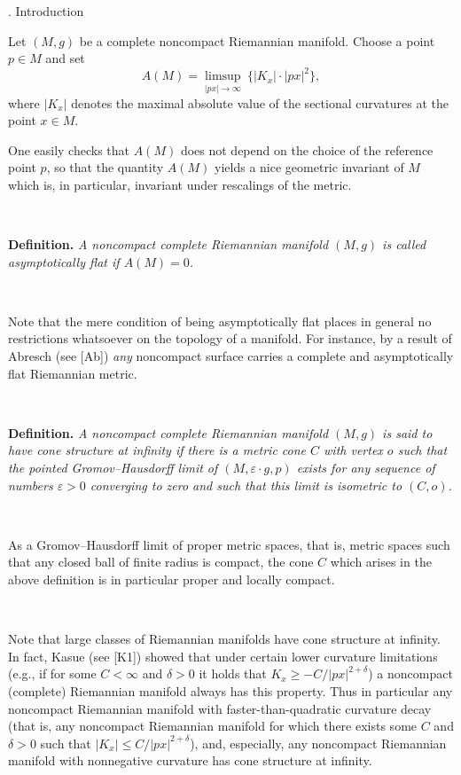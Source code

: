   


. Introduction 
\endhead 


\noindent 
Let $(M,g)$ be a complete noncompact Riemannian manifold.
Choose a point $p\in M$ and set 
$$A(M)=\limsup_{|px|\to\infty} \ \{|K_x|{\cdot}|px|^2\},$$ 
where $|K_x|$ denotes the maximal 
absolute value of the sectional curvatures at the point $x\in M$. 
 
One easily checks that $A(M)$ 
does not depend on the choice of the reference point $p$,
so that the quantity $A(M)$ yields a nice geometric invariant of $M$
which is, in particular, invariant under rescalings of the metric.
 
\ 
 
\noindent 
{\bf Definition.\ts}
{\it 
A noncompact complete Riemannian manifold $(M,g)$   
is called {\rm asymptotically flat} if $A(M)=0$. 
}
 
\  

Note that the 
mere condition of being asymptotically flat places in general
no restrictions whatsoever on the topology of a manifold.
For instance, by a result of Abresch (see [Ab])
{\sl any} noncompact surface carries
a complete and asymptotically flat Riemannian metric.

\
 
\noindent 
{\bf Definition.\ts} 
{\it 
A noncompact complete Riemannian manifold $(M,g)$ is said  
to have {\rm cone structure at infinity} if there is a  
metric cone $C$ with vertex $o$ such that the pointed Gromov--Hausdorff limit 
of $(M,\varepsilon{\cdot} g,p)$ exists
for any sequence of numbers $\varepsilon>0$ converging to zero
and such that this limit is isometric to $(C,o)$. 
}

\ 

As a Gromov--Hausdorff limit
of proper metric spaces,
that is, metric spaces such that any closed ball of finite radius is compact,
the cone $C$ which arises in the above definition
is in particular proper and locally compact.
 
\  
 

Note that large classes of Riemannian manifolds have
cone structure at infinity.
In fact,
Kasue (see [K1]) showed that under certain lower curvature limitations 
(e.g., if for some $C<\infty$ and $\delta>0$ it holds that 
$K_x\ge -C/|px|^{2+\delta}$) 
a noncompact (complete) Riemannian manifold always has this property. 
Thus in particular
any noncompact Riemannian manifold
with faster-than-quadratic curvature decay
(that is, any noncompact Riemannian manifold for which 
there exists some $C$ and $\delta>0$ such that
$|K_x|\le C/|px|^{2+\delta}$),
and, especially, any noncompact Riemannian manifold
with nonnegative curvature
has cone structure at infinity.



